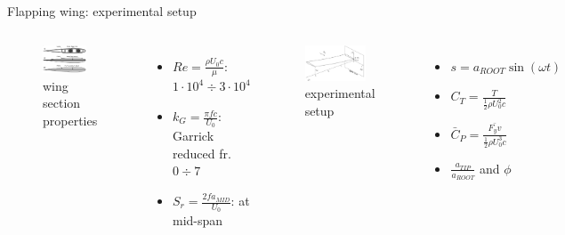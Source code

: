 \documentclass[10pt,t]{beamer}
\begin{document}
\begin{frame}{Flapping wing: experimental setup}
\label{heathcote}
    \begin{columns}
        \begin{figure}
	    \centering
	        \includegraphics[width=0.8\textwidth]{images/heathcote/profiles0012}
	        \caption{wing section properties}
        \end{figure}

\footnotesize
\begin{itemize}
	\item $Re = \frac{\rho U_0 c}{\mu}$: $1\cdot10^4\div 3\cdot10^4$
	\item $k_G = \frac{\pi f c}{U_0}$: Garrick reduced fr. $0 \div 7$
	\item $S_r = \frac{2f a_{MID}}{U_0}$: at mid-span
\end{itemize}



    
        \begin{figure}
	    \centering
	        \includegraphics[width=0.87\textwidth]{images/heathcote/naca0012_exp}
	        \caption{experimental setup}
        \end{figure}

\footnotesize
\begin{itemize}
	\item $s = a_{ROOT} \sin(\omega t)$
	\item $C_T = \frac{T}{\frac{1}{2}\rho U_0^2c}$
	\item $\bar{C}_P = \frac{\bar{F_y v}}{\frac{1}{2}\rho U_0^3c}$
	\item $\frac{a_{TIP}}{a_{ROOT}}$ and  $\phi$
\end{itemize}


\end{columns}


\end{frame}
\end{document}
